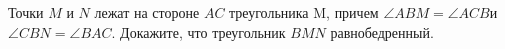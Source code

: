 \begin{ex}
	\begin{condition}
		Точки \( M  \) и \( N  \) лежат на стороне \( AC  \) треугольника M, причем \(\angle ABM = \angle ACB  \)и \( \angle CBN = \angle BAC \). Докажите, что треугольник \( BMN  \) равнобедренный.
	\end{condition}
\end{ex}